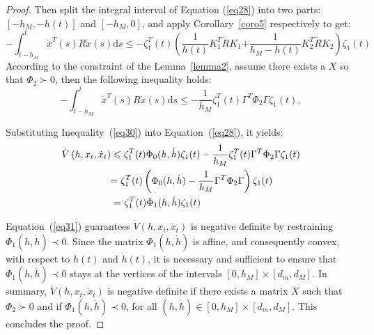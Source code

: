 \documentclass[a4paper]{cas-sc}
\newtheorem*{proof}{Proof}
\begin{document}
\begin{proof}
  Then split the integral interval of Equation (\ref{eq28}) into two parts: $ [ - {h_M}, - h(t)] $ and $ [ - {h_M},0] $, and apply Corollary~\ref{coro5} respectively to get:
  \begin{equation}
    \label{eq29}
    - \int_{t - {h_M}}^t {{{\dot x}^T}} (s)R\dot x(s){\text{d}}s \leqslant  - \zeta _1^T(t)\left( {\frac{1}{{h(t)}}K_1^T\tilde R{K_1}} \right.\left. { + \frac{1}{{{h_M} - h(t)}}K_2^T\tilde R{K_2}} \right){\zeta _1}(t)
  \end{equation}
  According to the constraint of the Lemma~\ref{lemma2}, assume there exists a $X$ so that $ {\Phi _2} \succ 0 $, then the following inequality holds:
  \begin{equation}
    \label{eq30}
    - \int_{t - {h_M}}^t {{{\dot x}^T}} (s)R\dot x(s){\text{d}}s \leqslant  - \frac{1}{{{h_M}}}\zeta _1^T(t){\Gamma ^T}{\Phi _2}\Gamma {\zeta _1}(t),
  \end{equation}

  Substituting Inequality~(\ref{eq30}) into Equation~(\ref{eq28}), it yields:
  \begin{equation}
    \label{eq31}
    \begin{gathered}
      \dot V\left( {h,{x_t},{{\dot x}_t}} \right) \leqslant \zeta _1^T(t){\Phi _0}(h,\dot h){\zeta _1}(t) - \frac{1}{{{h_M}}}\zeta _1^T(t){\Gamma ^T}{\Phi _2}\Gamma {\zeta _1}(t) \hfill \\
      \quad \quad \quad \quad \quad  = \zeta _1^T(t)\left( {{\Phi _0}(h,\dot h) - \frac{1}{{{h_M}}}{\Gamma ^T}{\Phi _2}\Gamma } \right){\zeta _1}(t) \hfill \\
      \quad \quad \quad \quad \quad {\text{ = }}\zeta _1^T(t){\Phi _1}(h,\dot h){\zeta _1}(t) \hfill \\
    \end{gathered}
  \end{equation}

  Equation~(\ref{eq31}) guarantees $ \dot V\left( {h,{x_t},{{\dot x}_t}} \right) $ is negative definite by restraining $ {\Phi _1}(h,\dot h) \prec 0 $. Since the matrix $ {\Phi _1}(h,\dot h) $ is affine, and consequently convex, with respect to $ h(t) $ and $ \dot h(t) $, it is necessary and sufficient to ensure that $ {\Phi _1}(h,\dot h) \prec 0 $ stays at the vertices of the intervals $ \left[ {0,{h_M}} \right] \times \left[ {{d_m},{d_M}} \right] $. In summary, $ \dot V\left( {h,{x_t},{{\dot x}_t}} \right) $ is negative definite if there exists a matrix $X$ such that $ {\Phi _2} \succ 0 $ and if $ {\Phi _1}(h,\dot h) \prec 0 $, for all $ (h,\dot h) \in \left[ {0,{h_M}} \right] \times \left[ {{d_m},{d_M}} \right] $. This concludes the proof.

\end{proof}
\end{document}

